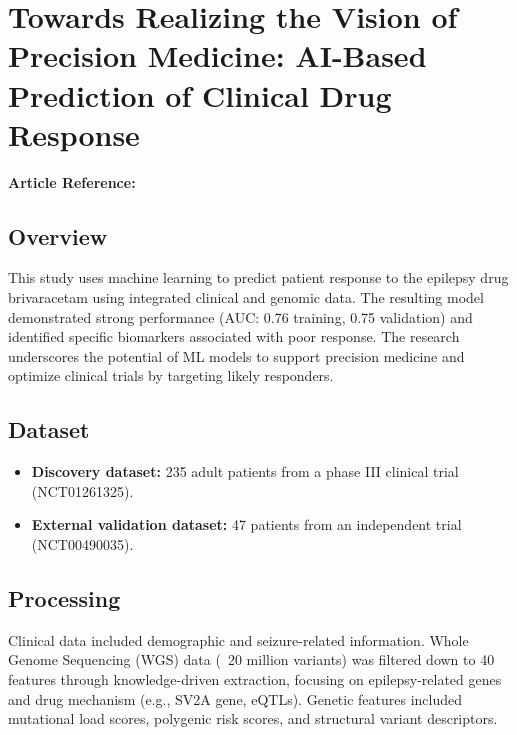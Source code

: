 \section{Towards Realizing the Vision of Precision Medicine: AI-Based Prediction of Clinical Drug Response}
\textbf{Article Reference:} \cite{article_1}

\subsection*{Overview}
This study uses machine learning to predict patient response to the epilepsy drug brivaracetam using integrated clinical and genomic data. The resulting model demonstrated strong performance (AUC: 0.76 training, 0.75 validation) and identified specific biomarkers associated with poor response. The research underscores the potential of ML models to support precision medicine and optimize clinical trials by targeting likely responders.

\subsection*{Dataset}
\begin{itemize}
    \item \textbf{Discovery dataset:} 235 adult patients from a phase III clinical trial (NCT01261325).
    \item \textbf{External validation dataset:} 47 patients from an independent trial (NCT00490035).
\end{itemize}

\subsection*{Processing}
Clinical data included demographic and seizure-related information. Whole Genome Sequencing (WGS) data (~20 million variants) was filtered down to 40 features through knowledge-driven extraction, focusing on epilepsy-related genes and drug mechanism (e.g., SV2A gene, eQTLs). Genetic features included mutational load scores, polygenic risk scores, and structural variant descriptors.

